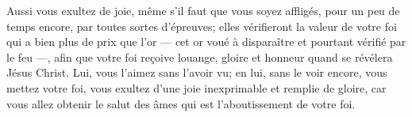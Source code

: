 Aussi vous exultez de joie,
	même s’il faut que vous soyez affligés, pour un peu de temps encore,
	par toutes sortes d’épreuves;
	elles vérifieront la valeur de votre foi qui a bien plus de prix que l’or
	--- cet or voué à disparaître et pourtant vérifié par le feu ---,
	afin que votre foi reçoive louange, gloire et honneur
	quand se révélera Jésus Christ.
Lui, vous l’aimez sans l’avoir vu;
	en lui, sans le voir encore, vous mettez votre foi,
	vous exultez d’une joie inexprimable et remplie de gloire,
	car vous allez obtenir le salut des âmes
	qui est l’aboutissement de votre foi.
